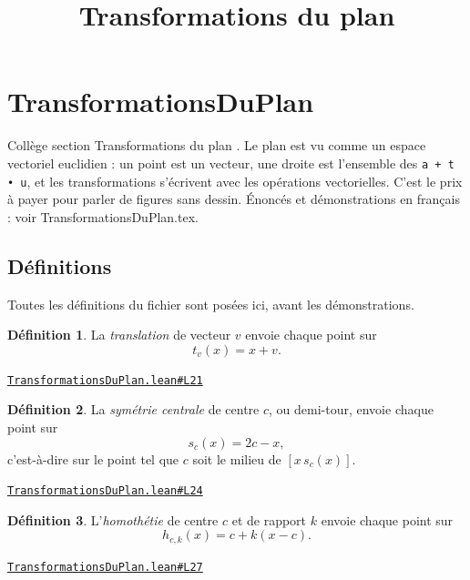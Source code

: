 \documentclass[11pt,a4paper]{article}
\title{Transformations du plan}
\date{}
\theoremstyle{definition}
\newtheorem{definition}{Définition}
\theoremstyle{plain}
\newcommand{\source}[2]{\par\smallskip\noindent\hfill{\footnotesize\href{#1}{\texttt{#2}}}\par\smallskip}
\begin{document}
\maketitle
\sloppy

\section{TransformationsDuPlan}

\noindent
Collège \textemdash{} section \og{} Transformations du plan \fg{}.
Le plan est vu comme un espace vectoriel euclidien : un point est un vecteur, une droite
est l'ensemble des \texttt{a + t • u}, et les transformations s'écrivent avec les opérations
vectorielles. C'est le prix à payer pour parler de figures sans dessin.
Énoncés et démonstrations en français : voir TransformationsDuPlan.tex.

\subsection{Définitions}

\noindent
Toutes les définitions du fichier sont posées ici, avant les démonstrations.

\begin{definition}
La \emph{translation} de vecteur $v$ envoie chaque point sur
\[ t_v(x) = x + v . \]
\end{definition}
\source{https://github.com/Commutator-IO/learn-lean/blob/main/cours/01-college/03-transformations-du-plan/TransformationsDuPlan.lean\#L21}{TransformationsDuPlan.lean\#L21}

\begin{definition}
La \emph{symétrie centrale} de centre $c$, ou demi-tour, envoie chaque point sur
\[ s_c(x) = 2c - x , \]
c'est-à-dire sur le point tel que $c$ soit le milieu de $[x\,s_c(x)]$.
\end{definition}
\source{https://github.com/Commutator-IO/learn-lean/blob/main/cours/01-college/03-transformations-du-plan/TransformationsDuPlan.lean\#L24}{TransformationsDuPlan.lean\#L24}

\begin{definition}
L'\emph{homothétie} de centre $c$ et de rapport $k$ envoie chaque point sur
\[ h_{c,k}(x) = c + k(x - c) . \]
\end{definition}
\source{https://github.com/Commutator-IO/learn-lean/blob/main/cours/01-college/03-transformations-du-plan/TransformationsDuPlan.lean\#L27}{TransformationsDuPlan.lean\#L27}
\end{document}
